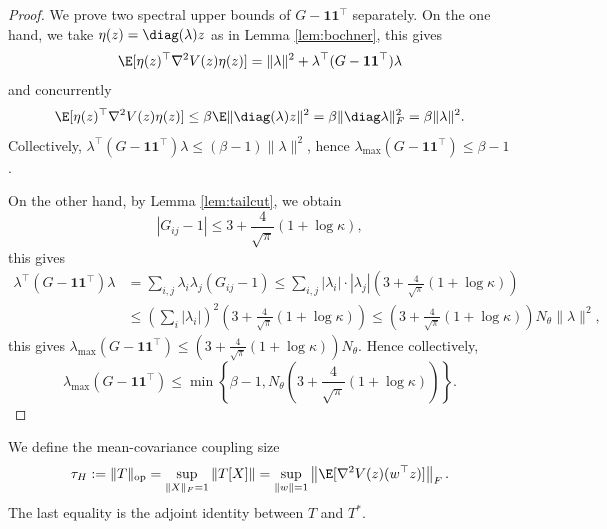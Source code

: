 \begin{proof}
    We prove two spectral upper bounds of $G - \mathbf{1} \mathbf{1}^\top$ separately. On the one hand, we take $\eta(z) = \diag (\lambda) z$ as in Lemma \ref{lem:bochner}, this gives
    \begin{equation*}
        \E[\eta(z)^\top \nabla^2 V (z) \eta (z)] = \|\lambda\|^2 + \lambda^\top (G - \mathbf{1} \mathbf{1}^\top) \lambda
    \end{equation*}
    and concurrently
    \begin{equation*}
        \E[\eta(z)^\top \nabla^2 V (z) \eta (z)] \leq \beta \E \|\diag (\lambda) z\|^2 = \beta \|\diag \lambda\|_F^2 = \beta \|\lambda\|^2.
    \end{equation*}
    Collectively, $\lambda^\top (G - \mathbf{1} \mathbf{1}^\top) \lambda \leq (\beta - 1) \|\lambda\|^2$, hence $\lambda_{\max} (G - \mathbf{1} \mathbf{1}^\top) \leq \beta - 1$.

    On the other hand, by Lemma \ref{lem:tailcut}, we obtain
    \begin{equation*}
        |G_{ij} - 1| \leq 3 + \frac{4}{\sqrt{\pi}} (1 + \log \kappa),
    \end{equation*}
    this gives
    \begin{align*}
        \lambda^\top (G - \mathbf{1} \mathbf{1}^\top) \lambda &= \sum_{i,j} \lambda_i \lambda_j (G_{ij} - 1) \leq \sum_{i, j} |\lambda_i| \cdot |\lambda_j| \left( 3 + \frac{4}{\sqrt{\pi}} (1 + \log \kappa) \right) \\
        &\leq \left( \sum_{i} |\lambda_i| \right)^2 \left( 3 + \frac{4}{\sqrt{\pi}} (1 + \log \kappa) \right) \leq  \left( 3 + \frac{4}{\sqrt{\pi}} (1 + \log \kappa) \right) N_\theta \|\lambda\|^2,
    \end{align*}
    this gives $\lambda_{\max} (G - \mathbf{1} \mathbf{1}^\top ) \leq \left( 3 + \frac{4}{\sqrt{\pi}} (1 + \log \kappa) \right) N_\theta$. Hence collectively,
    \begin{equation*}
        \lambda_{\max} (G - \mathbf{1} \mathbf{1}^\top) \leq \min \left\{\beta - 1, N_\theta \left(3 + \frac{4}{\sqrt{\pi}} (1 + \log \kappa) \right) \right\}.
    \end{equation*}
\end{proof}

\begin{definition}\label{def:tau-H}
    We define the mean-covariance coupling size
    \begin{equation*}
        \tau_H
        :=
        \|T\|_{\mathrm{op}}
        =
        \sup_{\|X\|_F=1}\|T[X]\|
        =
        \sup_{\|w\|=1}
        \left\|
        \E[\nabla^2 V(z)(w^\top z)]
        \right\|_F.
    \end{equation*}
    The last equality is the adjoint identity between $T$ and $T^*$.
\end{definition}

